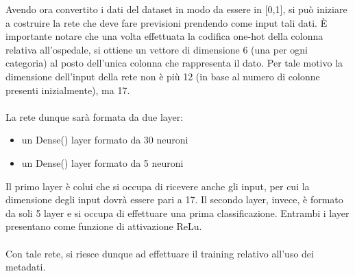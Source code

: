 Avendo ora convertito i dati del dataset in modo da essere in [0,1], si può iniziare a costruire la rete che deve fare previsioni 
prendendo come input tali dati. 
È importante notare che una volta effettuata la codifica one-hot della colonna relativa all'ospedale, si ottiene un vettore di dimensione 6 (una per ogni categoria) al 
posto dell'unica colonna che rappresenta il dato. Per tale motivo la dimensione dell'input della rete non è 
più 12 (in base al numero di colonne presenti inizialmente), ma 17.
\\\\
La rete dunque sarà formata da due layer:
\begin{itemize}
    \item un Dense() layer formato da 30 neuroni
    \item un Dense() layer formato da 5 neuroni
\end{itemize}
Il primo layer è colui che si occupa di ricevere anche gli input, per cui la dimensione degli input dovrà essere pari a 17.
Il secondo layer, invece, è formato da soli 5 layer e si occupa di effettuare una prima classificazione.
Entrambi i layer presentano come funzione di attivazione ReLu.
\\\\
Con tale rete, si riesce dunque ad effettuare il training relativo all'uso dei metadati.

